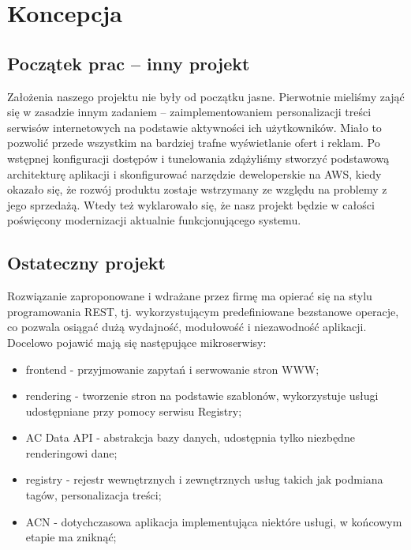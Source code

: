 \documentclass[licencjacka]{pracamgr}
\begin{document}
\chapter{Koncepcja}
	
\section{Początek prac – inny projekt}

Założenia naszego projektu nie były od początku jasne. Pierwotnie mieliśmy zająć się w zasadzie innym zadaniem – zaimplementowaniem personalizacji treści serwisów internetowych na podstawie aktywności ich użytkowników. Miało to pozwolić przede wszystkim na bardziej trafne wyświetlanie ofert i reklam. Po wstępnej konfiguracji dostępów i tunelowania zdążyliśmy stworzyć podstawową architekturę aplikacji i skonfigurować narzędzie deweloperskie na AWS, kiedy okazało się, że rozwój produktu zostaje wstrzymany ze względu na problemy z jego sprzedażą. Wtedy też wyklarowało się, że nasz projekt będzie w całości poświęcony modernizacji aktualnie funkcjonującego systemu.

\section{Ostateczny projekt}
	
Rozwiązanie zaproponowane i wdrażane przez firmę ma opierać się na stylu programowania REST, tj. wykorzystującym predefiniowane bezstanowe operacje, co pozwala osiągać dużą wydajność, modułowość i niezawodność aplikacji. Docelowo pojawić mają się następujące mikroserwisy:
\begin{itemize}
\item frontend - przyjmowanie zapytań i serwowanie stron WWW;
\item rendering - tworzenie stron na podstawie szablonów, wykorzystuje usługi udostępniane przy pomocy serwisu Registry;
\item AC Data API - abstrakcja bazy danych, udostępnia tylko niezbędne renderingowi dane;
\item registry - rejestr wewnętrznych i zewnętrznych usług takich jak podmiana tagów, personalizacja treści;
\item ACN - dotychczasowa aplikacja implementująca niektóre usługi, w końcowym etapie ma zniknąć;
\end{itemize}
\end{document}
